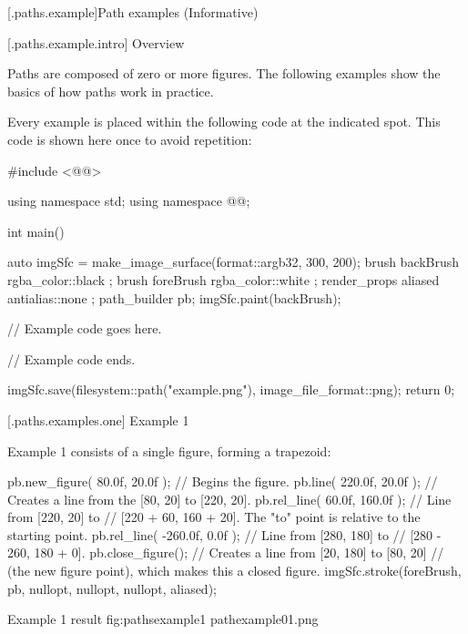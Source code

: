 
 [\iotwod.paths.example]{Path examples (Informative)}

 [\iotwod.paths.example.intro] {Overview}

\pnum
Paths are composed of zero or more figures. The following examples show the basics of how paths work in practice.

\pnum
Every example is placed within the following code at the indicated spot. This code is shown here once to avoid repetition:

\begin{codeblock}
#include <@\iotwodheader{}@>

using namespace std;
using namespace @\namespacenoinlinev{}@;

int main() {
  auto imgSfc = make_image_surface(format::argb32, 300, 200);
  brush backBrush{ rgba_color::black };
  brush foreBrush{ rgba_color::white };
  render_props aliased{ antialias::none };
  path_builder pb{};
  imgSfc.paint(backBrush);
  
  // Example code goes here.

  // Example code ends.
  
  imgSfc.save(filesystem::path("example.png"), image_file_format::png);
  return 0;
}
\end{codeblock}

 [\iotwod.paths.examples.one] {Example 1}

\pnum
Example 1 consists of a single figure, forming a trapezoid:

\begin{codeblock}
  pb.new_figure({ 80.0f, 20.0f }); // Begins the figure.
  pb.line({ 220.0f, 20.0f }); // Creates a line from the [80, 20] to [220, 20].
  pb.rel_line({ 60.0f, 160.0f }); // Line from [220, 20] to
    // [220 + 60, 160 + 20]. The "to" point is relative to the starting point.
  pb.rel_line({ -260.0f, 0.0f }); // Line from [280, 180] to 
    // [280 - 260, 180 + 0].
  pb.close_figure(); // Creates a line from [20, 180] to [80, 20] 
    // (the new figure point), which makes this a closed figure.
  imgSfc.stroke(foreBrush, pb, nullopt, nullopt, nullopt, aliased);
\end{codeblock}

\begin{importgraphiciotwod}
{Example 1 result}
{fig:pathsexample1}
{pathexample01.png}
\end{importgraphiciotwod}

\FloatBarrier

